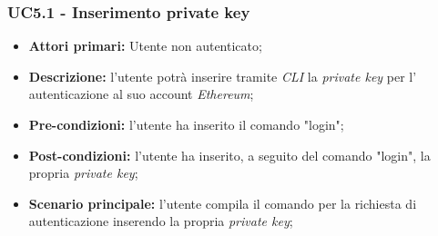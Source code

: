 \subsubsection{UC5.1 - Inserimento private key\glo}
\begin{itemize}
	\item \textbf{Attori primari:} Utente non autenticato;
	\item \textbf{Descrizione:} l'utente potrà inserire tramite \textit{CLI\glo} la \textit{private key\glo} per l' autenticazione al suo account \textit{Ethereum\glos}; 
	\item \textbf{Pre-condizioni:} l'utente ha inserito il comando "login";
	\item \textbf{Post-condizioni:} l'utente ha inserito, a seguito del comando "login", la propria \textit{private key\glos};
	\item \textbf{Scenario principale:} l'utente compila il comando per la richiesta di autenticazione inserendo la propria \textit{private key\glos};
\end{itemize}